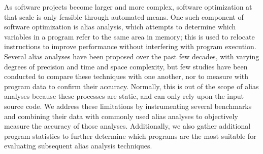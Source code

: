 As software projects become larger and more complex, software optimization at that scale is only feasible through automated means. One such component of software optimization is alias analysis, which attempts to determine which variables in a program refer to the same area in memory; this is used to relocate instructions to improve performance without interfering with program execution. Several alias analyses have been proposed over the past few decades, with varying degrees of precision and time and space complexity, but few studies have been conducted to compare these techniques with one another, nor to measure with program data to confirm their accuracy. Normally, this is out of the scope of alias analyses because these processes are static, and can only rely upon the input source code. We address these limitations by instrumenting several benchmarks and combining their data with commonly used alias analyses to objectively measure the accuracy of those analyses. Additionally, we also gather additional program statistics to further determine which programs are the most suitable for evaluating subsequent alias analysis techniques.

